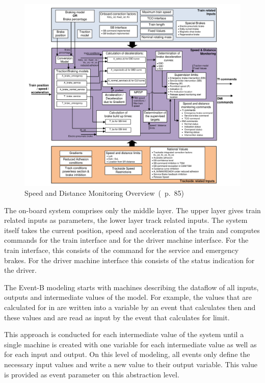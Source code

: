 \documentclass{template/openetcs_article}
\begin{document}
\begin{figure}[ht]
  \centering
  \includegraphics[width=.9\textwidth]{Overview_13_3}
  \caption{Speed and Distance Monitoring Overview~(\cite{SRS-026-330}~p.~85)}
  \label{fig:speed-distance-system}
\end{figure}

The on-board system comprises only the middle layer. The upper layer gives train
related inputs as parameters, the lower layer track related inputs. The system
itself takes the current position, speed and acceleration of the train and
computes commands for the train interface and for the driver machine
interface. For the train interface, this consists of the command for the service
and emergency brakes. For the driver machine interface this consists of the
status indication for the driver.

The Event-B modeling starts with machines describing the dataflow of all inputs,
outputs and intermediate values of the model. For example, the values that are
calculated for  in 
are written into a variable by an event that calculates then and these values
and are read as input by the event that calculates  for 
limit.

This approach is conducted for each intermediate value of the system until a
single machine is created with one variable for each intermediate value as well
as for each input and output. On this level of modeling, all events only define
the necessary input values and write a new value to their output variable. This
value is provided as event parameter on this abstraction level.
\end{document}
